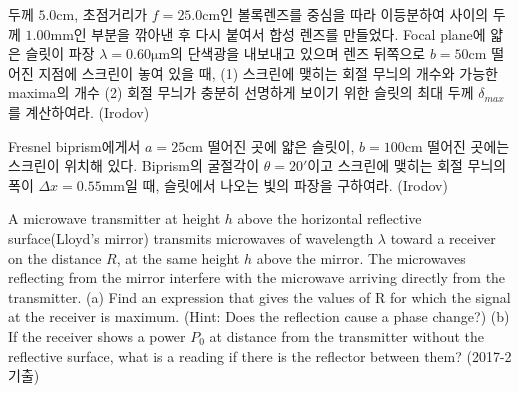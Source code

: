 \begin{problem}
두께 $5.0\mathrm{cm}$, 초점거리가 $f=25.0\mathrm{cm}$인 볼록렌즈를 중심을 따라 이등분하여 사이의 두께 $1.00\mathrm{mm}$인 부분을 깎아낸 후 다시 붙여서 합성 렌즈를 만들었다. Focal plane에 얇은 슬릿이 파장 $\lambda = 0.60\mathrm{\mu m}$의 단색광을 내보내고 있으며 렌즈 뒤쪽으로  $b=50\mathrm{cm}$ 떨어진 지점에 스크린이 놓여 있을 때, (1) 스크린에 맺히는 회절 무늬의 개수와 가능한 maxima의 개수 (2) 회절 무늬가 충분히 선명하게 보이기 위한 슬릿의 최대 두께 $\delta_{max}$를 계산하여라. (Irodov)
\end{problem}

\begin{problem}
Fresnel biprism에게서 $a=25\mathrm{cm}$ 떨어진 곳에 얇은 슬릿이, $b=100\mathrm{cm}$ 떨어진 곳에는 스크린이 위치해 있다. Biprism의 굴절각이 $\theta = 20'$이고 스크린에 맺히는 회절 무늬의 폭이 $\Delta x = 0.55\mathrm{mm}$일 때, 슬릿에서 나오는 빛의 파장을 구하여라. (Irodov)
\end{problem}

\begin{problem}
A microwave transmitter at height $h$ above the horizontal reflective surface(Lloyd's mirror) transmits microwaves of wavelength $\lambda$ toward a receiver on the distance $R$, at the same height $h$ above the mirror. The microwaves reflecting from the mirror interfere with the microwave arriving directly from the transmitter. 
(a) Find an expression that gives the values of R for which the signal at the receiver is maximum. (Hint: Does the reflection cause a phase change?)
(b) If the receiver shows a power $P_0$ at distance from the transmitter without the reflective surface, what is a reading if there is the reflector between them? (2017-2 기출)
\end{problem}



